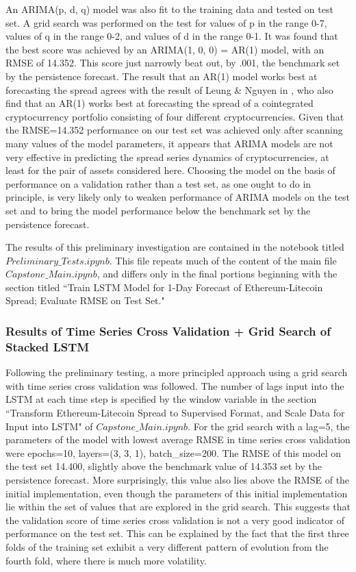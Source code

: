 \documentclass{article}
\begin{document}
An ARIMA(p, d, q) model was also fit to the training data and tested on test set. A grid search was performed on the test for values of p in the range 0-7, values of q in the range 0-2, and values of d in the range 0-1. It was found that the best score was achieved by an ARIMA(1, 0, 0) = AR(1) model, with an RMSE of 14.352. This score just narrowly beat out, by .001, the benchmark set by the persistence forecast. The result that an AR(1) model works best at forecasting the spread agrees with the result of Leung \& Nguyen in \cite{leung2018constructing}, who also find that an AR(1) works best at forecasting the spread of a cointegrated cryptocurrency portfolio consisting of four different cryptocurrencies. Given that the RMSE=14.352 performance on our test set was achieved only after scanning many values of the model parameters, it appears that ARIMA models are not very effective in predicting the spread series dynamics of cryptocurrencies, at least for the pair of assets considered here. Choosing the model on the basis of performance on a validation rather than a test set, as one ought to do in principle, is very likely only to weaken performance of ARIMA models on the test set and to bring the model performance below the benchmark set by the persistence forecast. 

The results of this preliminary investigation are contained in the notebook titled $Preliminary\_Tests.ipynb$. This file repeats much of the content of the main file $Capstone\_Main.ipynb$, and differs only in the final portions beginning with the section titled ``Train LSTM Model for 1-Day Forecast of Ethereum-Litecoin Spread; Evaluate RMSE on Test Set."

\subsubsection{Results of Time Series Cross Validation + Grid Search of Stacked LSTM}

Following the preliminary testing, a more principled approach using a grid search with time series cross validation was followed. The number of lags input into the LSTM at each time step is specified by the window variable in the section ``Transform Ethereum-Litecoin Spread to Supervised Format, and Scale Data for Input into LSTM" of $Capstone\_Main.ipynb$. For the grid search with a lag=5, the parameters of the model with lowest average RMSE in time series cross validation were epochs=10, layers=(3, 3, 1), batch\_size=200. The RMSE of this model on the test set 14.400, slightly above the benchmark value of 14.353 set by the persistence forecast. More surprisingly, this value also lies above the RMSE of the initial implementation, even though the parameters of this initial implementation lie within the set of values that are explored in the grid search. This suggests that the validation score of time series cross validation is not a very good indicator of performance on the test set. This can be explained by the fact that the first three folds of the training set exhibit a very different pattern of evolution from the fourth fold, where there is much more volatility. 
\end{document}
